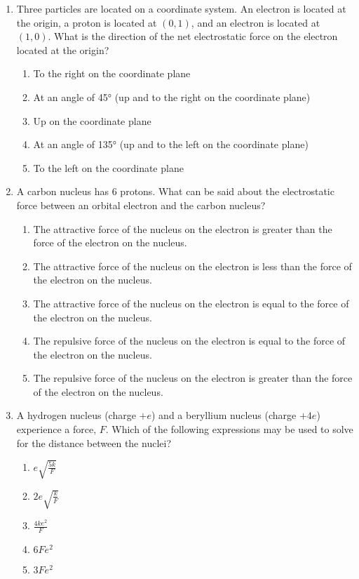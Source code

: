 \documentclass{../../../oss-apphys}
\begin{document}
\begin{multicols*}{2}
\begin{enumerate}[leftmargin=18pt]
   \item Three particles are located on a coordinate system. An electron is
     located at the origin, a proton is located at $(0,1)$, and an electron is
     located at $(1,0)$. What is the direction of the net electrostatic force on
     the electron located at the origin?
     \begin{enumerate}[nosep,leftmargin=18pt,label=(\Alph*)]
     \item To the right on the coordinate plane
     \item At an angle of \ang{45} (up and to the right on the coordinate plane)
     \item Up on the coordinate plane
     \item At an angle of \ang{135} (up and to the left on the coordinate plane)
     \item To the left on the coordinate plane
     \end{enumerate}
     \vspace{.7in}
     
   \item A carbon nucleus has 6 protons. What can be said about the
     electrostatic force between an orbital electron and the carbon nucleus?
     \begin{enumerate}[nosep,leftmargin=18pt,label=(\Alph*)]
     \item The attractive force of the nucleus on the electron is greater than
       the force of the electron on the nucleus.
     \item The attractive force of the nucleus on the electron is less than the
       force of the electron on the nucleus.
     \item The attractive force of the nucleus on the electron is equal to the
       force of the electron on the nucleus.
     \item The repulsive force of the nucleus on the electron is equal to the
       force of the electron on the nucleus.
     \item The repulsive force of the nucleus on the electron is greater than
       the force of the electron on the nucleus.
     \end{enumerate}
     \vspace{.7in}
     
   \item A hydrogen nucleus (charge $+e$) and a beryllium nucleus (charge $+4e$)
     experience a force, $F$. Which of the following expressions may be used
     to solve for the distance between the nuclei?
     \begin{enumerate}[nosep,leftmargin=18pt,label=(\Alph*)]
     \item$e\sqrt{\frac{5k}F}$
     \item$2e\sqrt{\frac{k}F}$
     \item$\frac{4ke^2}F$
     \item$6Fe^2$
     \item$3Fe^2$
     \end{enumerate}
     \vspace{.7in}
     \columnbreak
     

\end{enumerate}
\end{multicols*}
\end{document}
